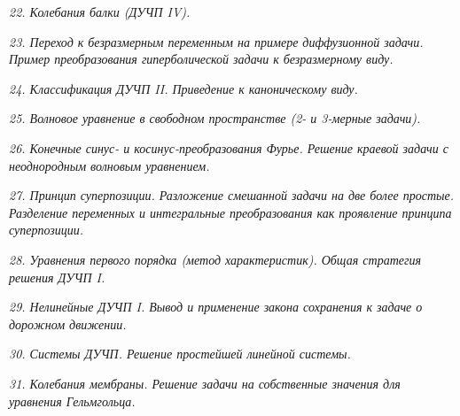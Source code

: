 \newpage %

\emph{22. Колебания балки (ДУЧП IV).}

\newpage %

\emph{23. Переход к безразмерным переменным на примере диффузионной задачи.
Пример преобразования гиперболической задачи к безразмерному виду.}

\newpage %

\emph{24. Классификация ДУЧП II. Приведение к каноническому виду.}

\newpage %

\emph{25. Волновое уравнение в свободном пространстве (2- и 3-мерные задачи).}

\newpage %

\emph{26. Конечные синус- и косинус-преобразования Фурье. Решение краевой задачи
с неоднородным волновым уравнением.}

\newpage %

\emph{27. Принцип суперпозиции. Разложение смешанной задачи на две более
простые. Разделение переменных и интегральные преобразования как проявление
принципа суперпозиции.}

\newpage %

\emph{28. Уравнения первого порядка (метод характеристик). Общая стратегия
решения ДУЧП I.}

\newpage %

\emph{29. Нелинейные ДУЧП I. Вывод и применение закона сохранения к задаче о
дорожном движении.}

\newpage %

\emph{30. Системы ДУЧП. Решение простейшей линейной системы.}

\newpage %

\emph{31. Колебания мембраны. Решение задачи на собственные значения для
уравнения Гельмгольца.}


